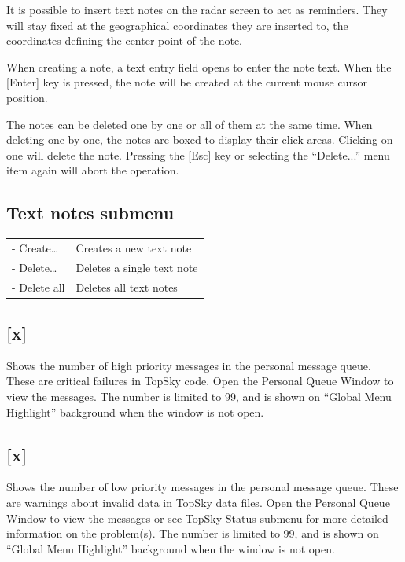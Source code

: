 \documentclass[11pt,a4paper,oldfontcommands]{memoir}
\begin{document}
It is possible to insert text notes on the radar screen to act as reminders. They will stay fixed at the geographical coordinates they are inserted to, the coordinates defining the center point of the note.

When creating a note, a text entry field opens to enter the note text. When the [Enter] key is pressed, the note will be created at the current mouse cursor position.

The notes can be deleted one by one or all of them at the same time. When deleting one by one, the notes are boxed to display their click areas. Clicking on one will delete the note. Pressing the [Esc] key or selecting the “Delete...” menu item again will abort the operation.

\subsection*{Text notes submenu}
\begin{tabular}{l l}
\\- Create…     & Creates a new text note
\\- Delete…     & Deletes a single text note
\\- Delete all  & Deletes all text notes
\end{tabular}

\medskip

\subsection{[x]}
Shows the number of high priority messages in the personal message queue. These are critical failures in TopSky code. Open the Personal Queue Window to view the messages. The number is limited to 99, and is shown on “Global Menu Highlight” background when the window is not open. 
\subsection{[x]}
Shows the number of low priority messages in the personal message queue. These are warnings about invalid data in TopSky data files. Open the Personal Queue Window to view the messages or see TopSky Status submenu for more detailed information on the problem(s). The number is limited to 99, and is shown on “Global Menu Highlight” background when the window is not open. 
\end{document}
